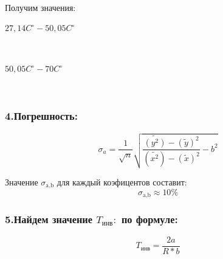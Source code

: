 \documentclass[a4paper,12pt]{article}
\theoremstyle{plain} %
\theoremstyle{definition} %
\theoremstyle{remark} %
\begin{document}
\begin{huge}
\ \\[1ex]
Получим значения:
\end{huge}
\begin{center}
\large{$27,14C^\circ - 50,05C^\circ$}\\
\end{center} 
\begin{minipage}{0.4\textwidth}
\end{minipage}
\hfill
\begin{minipage}{0.4\textwidth}
\end{minipage}
\\[7mm]

\begin{center}
\large{$50,05C^\circ - 70C^\circ$}\\
\end{center} 

\begin{minipage}{0.4\textwidth}
\end{minipage}
\hfill
\begin{minipage}{0.4\textwidth}
\end{minipage}
\\[7mm]


\subsubsection*{4.Погрешность:}
\[\sigma_a =  \dfrac{1}{\sqrt{n}}\sqrt{\dfrac{\tilde{(y^2)} - (\tilde{y})^2 }{(\tilde{x^2}) - (\tilde{x})^2}- b^2} \]

Значение $\sigma_\text{a,b}$ для каждый коэфицентов составит:
\[\sigma_\text{a,b} \approx 10 \% \]

\subsubsection*{5.Найдем значение $T_{\text{инв}}:$ по формуле:}
\[T_{\text{инв}} = \dfrac{2a}{R*b} \]

\begin{minipage}{0.25\textwidth}
	~~~~~~~~ 
\end{minipage}

\hfill
\begin{minipage}{0.25\textwidth}
   
\end{minipage}
\end{document}

